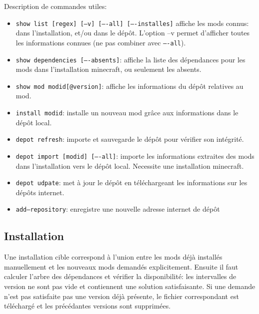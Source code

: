 \documentclass{article}
\begin{document}
\medskip
Description de commandes utiles:
\begin{itemize}
    \item \texttt{show list [regex] [--v] [----all] [----installes]} affiche les mods connus: dans l'installation, et/ou dans le dépôt.
L'option --v permet d'afficher toutes les informations connues (ne pas combiner avec \texttt{----all}).
    \item \texttt{show dependencies [----absents]}: affiche la liste des dépendances pour les mods dans l'installation minecraft, ou seulement les absents.
    \item \texttt{show mod modid[@version]}: affiche les informations du dépôt relatives au mod.
    \item \texttt{install modid}: installe un nouveau mod grâce aux informations dans le dépôt local.
    \item \texttt{depot refresh}: importe et sauvegarde le dépôt pour vérifier son intégrité.
    \item \texttt{depot import [modid] [----all]}: importe les informations extraites des mods dans l'installation vers le dépôt local.
Necessite une installation minecraft.
    \item \texttt{depot udpate}: met à jour le dépôt en téléchargeant les informations sur les dépôts internet.
    \item \texttt{add--repository}: enregistre une nouvelle adresse internet de dépôt
\end{itemize}


\subsection{Installation}
Une installation cible correspond à l'union entre les mods déjà installés manuellement et les nouveaux mods demandés explicitement.
Ensuite il faut calculer l'arbre des dépendances et vérifier la disponibilité: les intervalles de version ne sont pas vide et contiennent une solution satisfaisante.
Si une demande n'est pas satisfaite pas une version déjà présente, le fichier correspondant est téléchargé et les précédantes versions sont supprimées.
\end{document}
